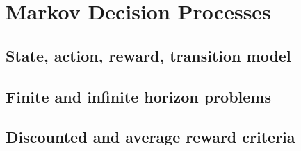 
\section{Markov Decision Processes}

\subsection{State, action, reward, transition model}


\subsection{Finite and infinite horizon problems}


\subsection{Discounted and average reward criteria}

